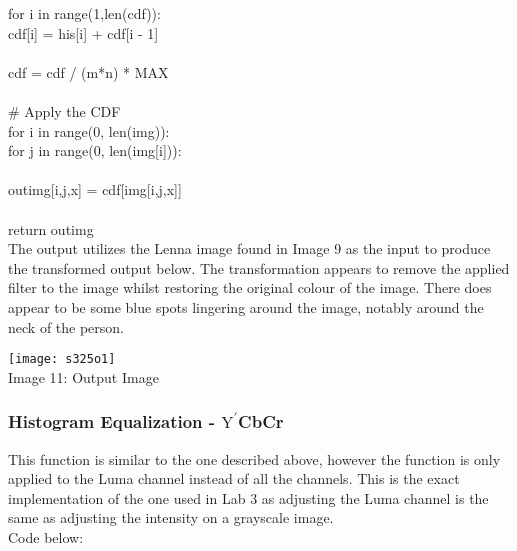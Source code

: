 \documentclass{article}
\begin{document}
	\indent \indent for i in range(1,len(cdf)):\\
	\indent \indent \indent cdf[i] = his[i] + cdf[i - 1]\\
	\\
	\indent \indent cdf = cdf / (m*n) * MAX\\
	\\
	\indent \indent \# Apply the CDF\\
	\indent \indent for i in range(0, len(img)):\\
	\indent \indent \indent for j in range(0, len(img[i])):\\
	\\
	\indent \indent out\textunderscore img[i,j,x] = cdf[img[i,j,x]]\\
	\\
	\indent return out\textunderscore img\\
	
	The output utilizes the Lenna image found in Image 9 as the input to produce the transformed output below. The transformation appears to remove the applied filter to the image whilst restoring the original colour of the image. There does appear to be some blue spots lingering around the image, notably around the neck of the person.\\
	
	\begin{center}
		\noindent \texttt{[image: s325o1]}\\
		Image 11: Output Image 
	\end{center}
	
	\subsubsection{Histogram Equalization - $\textrm{Y}^\prime$CbCr}
	
	This function is similar to the one described above, however the function is only applied to the Luma channel instead of all the channels. This is the exact implementation of the one used in Lab 3 as adjusting the Luma channel is the same as adjusting the intensity on a grayscale image.\\
	
	Code below:\\
	
\end{document}
